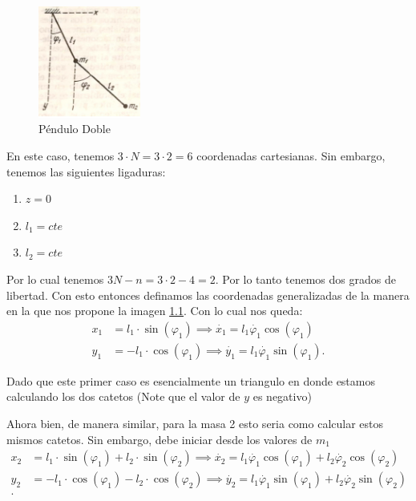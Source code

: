 \documentclass{report}
\begin{document}
\chapter{}

\begin{figure}[H]
  \centering
  \includegraphics[width=0.3\textwidth]{img/pregunta_1.png}
  \caption{Péndulo Doble}
  \label{fig:pregunta_1}
\end{figure}

En este caso, tenemos $3 \cdot N = 3\cdot 2 = 6$ coordenadas cartesianas. Sin embargo, tenemos las siguientes ligaduras:
\begin{enumerate}
  \item $z = 0$
  \item  $l_1 = cte$
  \item $l_2 = cte$
\end{enumerate}

Por lo cual tenemos $3N - n = 3 \cdot 2 - 4 = 2$. Por lo tanto tenemos dos grados de libertad. Con esto entonces definamos las coordenadas generalizadas de la manera en la que nos propone la imagen \ref{fig:pregunta_1}. Con lo cual nos queda:
\begin{align*}
  x_1 &= l_1\cdot \sin\left(\varphi_1\right)  \implies \dot{x_1} = l_1 \dot{\varphi_1} \cos\left( \varphi_1 \right) \\
  y_1 &= -l_1\cdot \cos\left(\varphi_1\right) \implies \dot{y_1} = l_1\dot{\varphi_1}\sin\left( \varphi_1 \right) 
.\end{align*}

Dado que este primer caso es esencialmente un triangulo en donde estamos calculando los dos catetos (Note que el valor de $y$ es negativo)

Ahora bien, de manera similar, para la masa 2 esto seria como calcular estos mismos catetos. Sin embargo, debe iniciar desde los valores de $m_1$
\begin{align*}
  x_2 &= l_1\cdot \sin\left(\varphi_1\right) + l_2 \cdot \sin\left( \varphi_2 \right) \implies \dot{x_2} = l_1\dot{\varphi_1}\cos\left( \varphi_1 \right) + l_2 \dot{\varphi_2}\cos\left( \varphi_2 \right)  \\
  y_2 &= -l_1\cdot \cos\left(\varphi_1\right) - l_2 \cdot \cos\left( \varphi_2 \right) \implies \dot{y_2} = l_1\dot{\varphi_1}\sin\left( \varphi_1 \right) + l_2 \dot{\varphi_2}\sin\left( \varphi_2 \right)  \\
.\end{align*}
\end{document}
